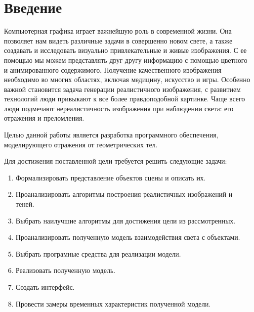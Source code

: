 \chapter*{Введение}

Компьютерная графика играет важнейшую роль в современной жизни. 
Она позволяет нам видеть различные задачи в совершенно новом свете, а также создавать и исследовать визуально привлекательные и живые изображения.
С ее помощью мы можем представлять друг другу информацию с помощью цветного и анимированного содержимого. 
Получение качественного изображения необходимо во многих областях, включая медицину, искусство и игры.
Особенно важной становится задача генерации реалистичного изображения, с развитием технологий люди привыкают к все более
правдоподобной картинке. Чаще всего люди подмечают нереалистичность изображения при наблюдении света: его отражения и преломления.


Целью данной работы является разработка программного обеспечения, моделирующего отражения от геометрических тел.

Для достижения поставленной цели требуется решить следующие задачи:
\begin{enumerate}
	\item Формализировать представление объектов сцены и описать их.
	\item Проанализировать алгоритмы построения реалистичных изображений и теней.
	\item Выбрать наилучшие алгоритмы для достижения цели  из рассмотренных.
	\item Проанализировать полученную  модель взаимодействия света с объектами.
	\item Выбрать програмные средства для реализации модели.
	\item Реализовать полученную модель.
	\item Создать интерфейс.
	\item Провести замеры временных характеристик полученной модели.
\end{enumerate}
